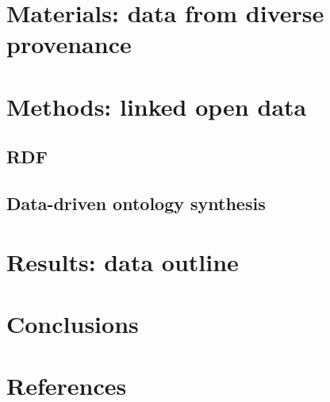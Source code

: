 \documentclass[review]{elsarticle}
\begin{document}
\section{Materials: data from diverse provenance}

\section{Methods: linked open data}
\subsection{RDF}
\subsection{Data-driven ontology synthesis}

\section{Results: data outline}
\label{outline}

\section{Conclusions}
\label{conclusions}

\section*{References}
%

%
%
\end{document}

